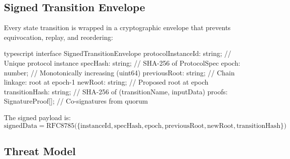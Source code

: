 \documentclass[11pt,a4paper]{article}
\begin{document}
\subsection{Signed Transition Envelope}

Every state transition is wrapped in a cryptographic envelope that prevents
equivocation, replay, and reordering:

\begin{codebox}{typescript}
interface SignedTransitionEnvelope {
  protocolInstanceId: string;  // Unique protocol instance
  specHash: string;            // SHA-256 of ProtocolSpec
  epoch: number;               // Monotonically increasing (uint64)
  previousRoot: string;        // Chain linkage: root at epoch-1
  newRoot: string;             // Proposed root at epoch
  transitionHash: string;      // SHA-256 of (transitionName, inputData)
  proofs: SignatureProof[];    // Co-signatures from quorum
}
\end{codebox}

\noindent The signed payload is:
\[
  \text{signedData} = \text{RFC8785}\Big(\big\{
    \text{instanceId}, \text{specHash}, \text{epoch},
    \text{previousRoot}, \text{newRoot}, \text{transitionHash}
  \big\}\Big)
\]

\subsection{Threat Model}
\end{document}

